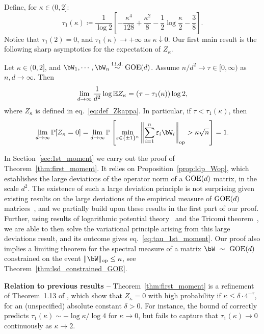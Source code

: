 Define, for $\kappa \in (0,2]$:
\begin{equation}
    \label{eq:tau_1st_moment}
    \tau_1(\kappa) \coloneqq
        \frac{1}{\log 2} \left[- \frac{\kappa^4}{128} + \frac{\kappa^2}{8} - \frac{1}{2} \log \frac{\kappa}{2} - \frac{3}{8}\right].
\end{equation}
Notice that $\tau_1(2) = 0$, and $\tau_1(\kappa) \to +\infty$ as $\kappa \downarrow 0$.
Our first main result is the following sharp asymptotics for the expectation of $Z_\kappa$.
\begin{theorem}\label{thm:first_moment}
    Let $\kappa \in (0,2]$, and $\bW_1, \cdots, \bW_n \iid \GOE(d)$.
    Assume $n/d^2 \to \tau \in [0, \infty)$ as $n, d\to \infty$. 
    Then 
    \begin{equation}
        \label{eq:limit_logEZ}
        \lim_{d \to \infty} \frac{1}{d^2} \log \mathbb{E} Z_\kappa = (\tau - \tau_1(\kappa)) \log 2,
    \end{equation}
    where $Z_\kappa$ is defined in eq.~\eqref{eq:def_Zkappa}.
    In particular, if $\tau < \tau_1(\kappa)$, then
    \begin{equation*}
        \lim_{d \to \infty} \bbP[Z_\kappa = 0] = \lim_{d \to \infty} \bbP\left[\min_{\eps \in \{\pm 1\}^n} \left\|\sum_{i=1}^n \eps_i \bW_i \right\|_\op > \kappa \sqrt{n}\right] = 1.
    \end{equation*}
\end{theorem}
\noindent
In Section~\ref{sec:1st_moment} we carry out the proof of Theorem~\ref{thm:first_moment}. 
It relies on Proposition~\ref{prop:ldp_Wop}, which establishes the large deviations of the operator norm of a 
$\mathrm{GOE}(d)$ matrix, in the scale $d^2$. 
The existence of such a large deviation principle is not surprising given existing results on the large deviations of the empirical measure 
of $\mathrm{GOE}(d)$ matrices~\citep{arous1997large}, 
and we partially build upon these results in the first part of our proof.
Further, using results of logarithmic potential theory~\citep{saff2013logarithmic} and the Tricomi theorem~\citep{tricomi1985integral}, we are able to then solve the variational principle arising from this large deviations result, 
and its outcome gives eq.~\eqref{eq:tau_1st_moment}.
Our proof also implies a limiting theorem for the spectral measure of a matrix $\bW~\sim~\GOE(d)$ constrained on the event $\|\bW\|_\op \leq \kappa$, see Theorem~\ref{thm:lsd_constrained_GOE}.

\myskip
\textbf{Relation to previous results --}
Theorem~\ref{thm:first_moment} is a refinement of Theorem~1.13 of \cite{kunisky2023online}, 
which show that $Z_\kappa = 0$ with high probability if $\kappa \leq \delta \cdot 4^{-\tau}$, for an (unspecified) absolute constant $\delta > 0$.
For instance, the bound of \cite{kunisky2023online} correctly predicts $\tau_1(\kappa) \sim - \log \kappa / \log 4$ for $\kappa \to 0$, but fails to capture that $\tau_1(\kappa) \to 0$ continuously as $\kappa \to 2$. 

